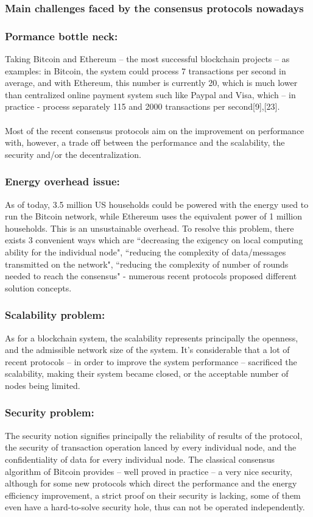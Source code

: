 \documentclass[doublespacing]{bmcart}
\begin{document}
\begin{CJK*}{UTF8}{gbsn}
\subsubsection{Main challenges faced by the consensus protocols nowadays}
\subsubsection*{Pormance bottle neck: }
Taking Bitcoin and Ethereum – the most successful blockchain projects – as examples: in Bitcoin, the system could process 7 transactions per second in average, and with Ethereum, this number is currently 20, which is much lower than centralized online payment system such like Paypal and Visa, which – in practice -  process separately 115 and 2000 transactions per second[9],[23].
\paragraph{}
	Most of the recent consensus protocols aim on the improvement on performance with, however, a trade off between the performance and the scalability, the security and/or the decentralization. 
\subsubsection*{Energy overhead issue:}	 As of today, 3.5 million US households could be powered with the energy used to run the Bitcoin network, while Ethereum uses the equivalent power of 1 million households. This is an unsustainable overhead. To resolve this problem, there exists 3 convenient ways which are ``decreasing the exigency on local computing ability for the individual node", ``reducing the complexity of data/messages transmitted on the network", ``reducing the complexity of number of rounds needed to reach the consensus" - numerous recent protocols proposed different solution concepts.
\subsubsection*{Scalability problem:}	  As for a blockchain system, the scalability represents principally the openness, and the admissible network size of the system. It’s considerable that a lot of recent protocols – in order to improve the system performance – sacrificed the scalability, making their system became closed, or the acceptable number of nodes being limited. 
\subsubsection*{Security problem:} The security notion signifies principally the reliability of results of the protocol, the security of transaction operation lanced by every individual node, and the confidentiality of data for every individual node. The classical consensus algorithm of Bitcoin provides – well proved in practice – a very nice security, although for some new protocols which direct the performance and the energy efficiency improvement, a strict proof on their security is lacking, some of them even have a hard-to-solve security hole, thus can not be operated independently.

\end{CJK*}
\end{document}
